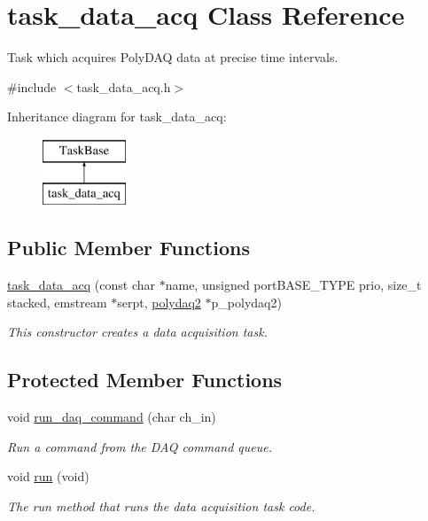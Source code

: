 \hypertarget{classtask__data__acq}{\section{task\-\_\-data\-\_\-acq Class Reference}
\label{classtask__data__acq}
}


Task which acquires Poly\-D\-A\-Q data at precise time intervals.  




{\ttfamily \#include $<$task\-\_\-data\-\_\-acq.\-h$>$}

Inheritance diagram for task\-\_\-data\-\_\-acq\-:\begin{figure}[H]
\begin{center}
\leavevmode
\includegraphics[height=2.000000cm]{classtask__data__acq}
\end{center}
\end{figure}
\subsection*{Public Member Functions}
\begin{DoxyCompactItemize}
\item 
\hyperlink{classtask__data__acq_af8239a8ad8e9f385f42364f446a2f358}{task\-\_\-data\-\_\-acq} (const char $\ast$name, unsigned port\-B\-A\-S\-E\-\_\-\-T\-Y\-P\-E prio, size\-\_\-t stacked, emstream $\ast$serpt, \hyperlink{classpolydaq2}{polydaq2} $\ast$p\-\_\-polydaq2)
\begin{DoxyCompactList}\small\item\em This constructor creates a data acquisition task. \end{DoxyCompactList}\end{DoxyCompactItemize}
\subsection*{Protected Member Functions}
\begin{DoxyCompactItemize}
\item 
void \hyperlink{classtask__data__acq_a8d3bef5618fc449eaa5c7e43e59e7d44}{run\-\_\-daq\-\_\-command} (char ch\-\_\-in)
\begin{DoxyCompactList}\small\item\em Run a command from the D\-A\-Q command queue. \end{DoxyCompactList}\item 
void \hyperlink{classtask__data__acq_ac8d2f460a3b177a3d5d1152dcc050021}{run} (void)
\begin{DoxyCompactList}\small\item\em The run method that runs the data acquisition task code. \end{DoxyCompactList}\end{DoxyCompactItemize}
